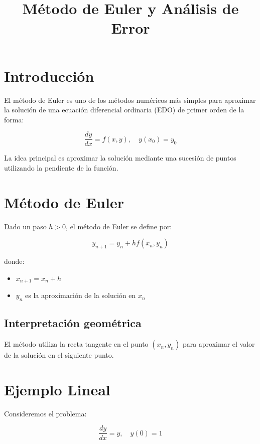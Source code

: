 \documentclass[12pt,a4paper]{article}
\title{Método de Euler y Análisis de Error}
\author{}
\date{}
\begin{document}
\maketitle

\section{Introducción}

El método de Euler es uno de los métodos numéricos más simples para aproximar la solución de una ecuación diferencial ordinaria (EDO) de primer orden de la forma:

\begin{equation}
\frac{dy}{dx} = f(x,y), \quad y(x_0) = y_0
\end{equation}

La idea principal es aproximar la solución mediante una sucesión de puntos utilizando la pendiente de la función.

\section{Método de Euler}

Dado un paso $h > 0$, el método de Euler se define por:

\begin{equation}
y_{n+1} = y_n + h f(x_n, y_n)
\end{equation}

donde:
\begin{itemize}
\item $x_{n+1} = x_n + h$
\item $y_n$ es la aproximación de la solución en $x_n$
\end{itemize}

\subsection{Interpretación geométrica}

El método utiliza la recta tangente en el punto $(x_n, y_n)$ para aproximar el valor de la solución en el siguiente punto.

\section{Ejemplo Lineal}

Consideremos el problema:

\begin{equation}
\frac{dy}{dx} = y, \quad y(0) = 1
\end{equation}
\end{document}
